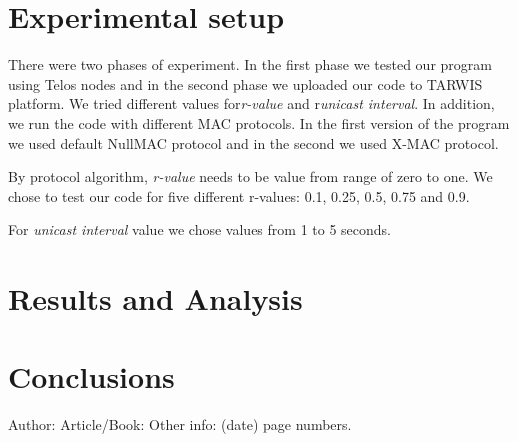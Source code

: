 \documentclass{llncs}
\begin{document}
\section{Experimental setup}
There were two phases of experiment. In the first phase we tested our program using Telos nodes and in the second phase we uploaded our code to TARWIS platform. We tried different values for\textit{r-value} and r\textit{unicast interval}. In addition, we run the code with different MAC protocols. In the first version of the program we used default NullMAC protocol and in the second we used X-MAC protocol. 

By protocol algorithm, \textit{r-value} needs to be value from range of zero to one. We chose to test our code for five different r-values: 0.1, 0.25, 0.5, 0.75 and 0.9. 

For \textit{unicast interval} value we chose values from 1 to 5 seconds. 

\begin{comment}
Results and Analysis: Analyse the results which are obtained by local sensors and
on TARWIS testbed. Analyse your data with respect to the aim of the experiment. Your
task during the experiment is not just to measure and document your measurements, but
to derive and present conclusions from your measurements.
\end{comment}

\section{Results and Analysis}

\begin{comment}
Conclusions: Summarize and discuss your results with respect to the literature or
your own scientific expectations. You should in particular discuss possible error sources
and give a short judgement on the quality of the experimental setup (because you also
learn to design the measurement setups). If needed, suggest how to improve the setups.
\end{comment}

\section{Conclusions}




%
%

\begin{thebibliography}{1}
Author:
Article/Book:
Other info: (date) page numbers.
\end{thebibliography}
\end{document}
